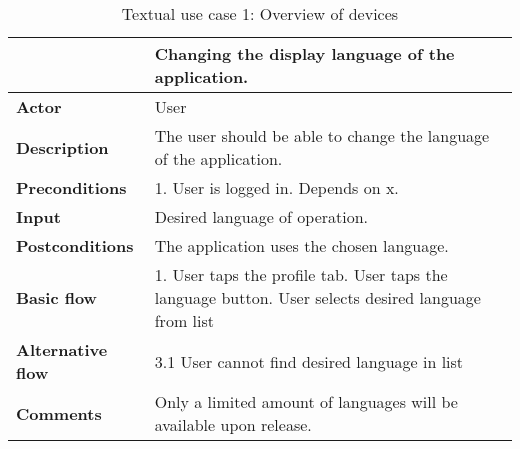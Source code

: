 \begin{table}[H]
\begin{tabular}{|l|p{12cm}|}
\hline
&\textbf{Changing the display language of the application.}
\\\hline
\textbf{Actor} &User
\\\hline
\textbf{Description}&
The user should be able to change the language of the application.\\\hline
\textbf{Preconditions}&
1. User is logged in.\newline
Depends on x.\\\hline
\textbf{Input}&
Desired language of operation.\\\hline
\textbf{Postconditions}& 
The application uses the chosen language.\\\hline
\textbf{Basic flow}&
1. User taps the profile tab\newline
2. User taps the language button\newline
3. User selects desired language from list
\\\hline
\textbf{Alternative flow}&
3.1 User cannot find desired language in list
\\\hline
\textbf{Comments}&Only a limited amount of languages will be available upon release. \\\hline
\end{tabular}
\caption{Textual use case 1: Overview of devices}
\end{table}


